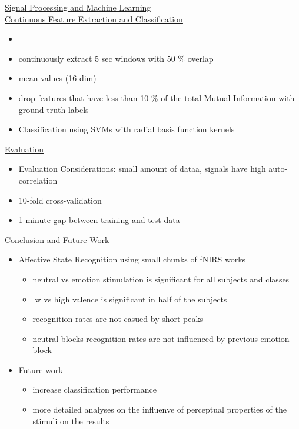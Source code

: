 \documentclass[a4paper,10pt,oneside]{article}
\begin{document}
\underline{Signal Processing and Machine Learning} \\
	

\underline{Continuous Feature Extraction and Classification} \\
	\begin{itemize}
		\item[] %
		\item continuously extract 5 sec windows with 50 \% overlap
		\item mean values (16 dim)
		\item drop features that have less than 10 \% of the total Mutual Information with ground truth labels
		\item Classification using SVMs with radial basis function kernels
	\end{itemize}
	

\underline{Evaluation} \\
	\begin{itemize}
		\item Evaluation Considerations: small amount of dataa, signals have high auto-correlation
		\item 10-fold cross-validation
		\item 1 minute gap between training and test data
	\end{itemize}
	

\underline{Conclusion and Future Work} \\
	\begin{itemize}
		\item Affective State Recognition using small chunks of fNIRS works
			\begin{itemize}
				\item neutral vs emotion stimulation is significant for all subjects and classes 
				\item lw vs high valence is significant in half of the subjects
				\item recognition rates are not casued by short peaks
				\item neutral blocks recognition rates are not influenced by previous emotion block
			\end{itemize}
		\item Future work
			\begin{itemize}
				\item increase classification performance 
				\item more detailed analyses on the influenve of perceptual properties of the stimuli on the results
			\end{itemize}
	\end{itemize}
	
\end{document}
